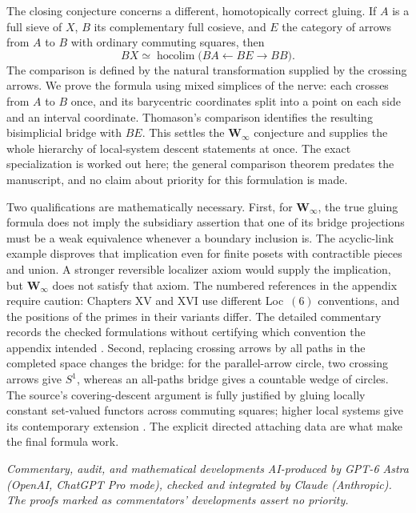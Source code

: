 The closing conjecture concerns a different, homotopically correct gluing. If \(A\) is a full sieve of \(X\), \(B\) its complementary full cosieve, and \(E\) the category of arrows from \(A\) to \(B\) with ordinary commuting squares, then
\[
 BX\simeq\operatorname{hocolim}\bigl(BA\longleftarrow BE\longrightarrow BB\bigr).
\]
The comparison is defined by the natural transformation supplied by the crossing arrows. We prove the formula using mixed simplices of the nerve: each crosses from \(A\) to \(B\) once, and its barycentric coordinates split into a point on each side and an interval coordinate. Thomason's comparison identifies the resulting bisimplicial bridge with \(BE\). This settles the \(\mathbf W_\infty\) conjecture and supplies the whole hierarchy of local-system descent statements at once. The exact specialization is worked out here; the general comparison theorem predates the manuscript, and no claim about priority for this formulation is made.

Two qualifications are mathematically necessary. First, for \(\mathbf W_\infty\), the true gluing formula does not imply the subsidiary assertion that one of its bridge projections must be a weak equivalence whenever a boundary inclusion is. The acyclic-link example disproves that implication even for finite posets with contractible pieces and union. A stronger reversible localizer axiom would supply the implication, but \(\mathbf W_\infty\) does not satisfy that axiom. The numbered references in the appendix require caution: Chapters XV and XVI use different Loc~\((6)\) conventions, and the positions of the primes in their variants differ. The detailed commentary records the checked formulations without certifying which convention the appendix intended \citep{Grothendieck1990XV,GrothendieckDerivateursXVI}. Second, replacing crossing arrows by all paths in the completed space changes the bridge: for the parallel-arrow circle, two crossing arrows give \(S^1\), whereas an all-paths bridge gives a countable wedge of circles. The source's covering-descent argument is fully justified by gluing locally constant set-valued functors across commuting squares; higher local systems give its contemporary extension \citep{Lurie2009HTT}. The explicit directed attaching data are what make the final formula work.

\medskip
\noindent\emph{Commentary, audit, and mathematical developments AI-produced by GPT-6 Astra (OpenAI, ChatGPT Pro mode), checked and integrated by Claude (Anthropic). The proofs marked as commentators' developments assert no priority.}
